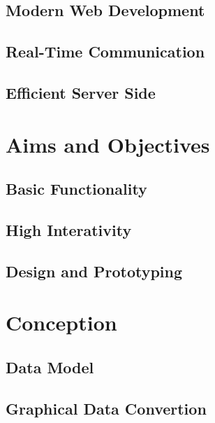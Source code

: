 \documentclass[english, BCOR=6mm, twoside=true, open=right]{tudscrreprt}
\begin{document}
\section{Modern Web Development}

\section{Real-Time Communication}

\section{Efficient Server Side}


\chapter{Aims and Objectives}
\section{Basic Functionality}
\section{High Interativity}
\section{Design and Prototyping}


\chapter{Conception}
\section{Data Model}
\section{Graphical Data Convertion}
\end{document}
